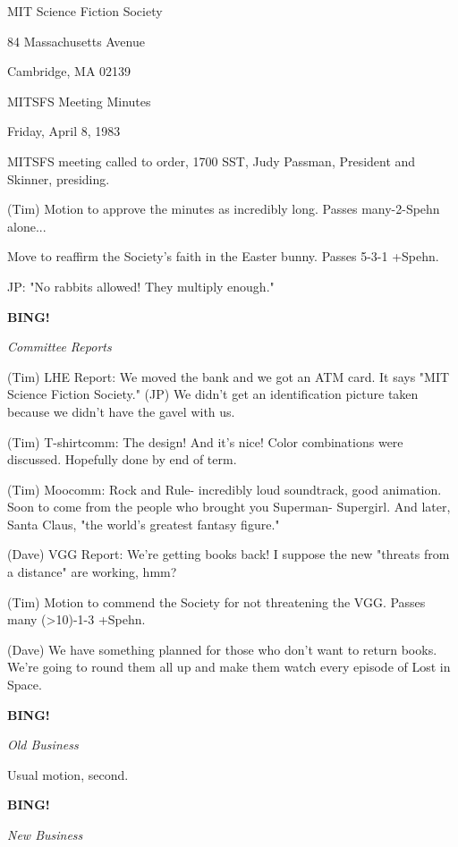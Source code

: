 \documentclass[12pt]{article}
\newcommand{\bing}{{\bf BING!} }
\newcommand{\goto}[1]{\bing \vskip 12pt \centerline{{\em{#1}}}}
\begin{document}
\begin{center}

MIT Science Fiction Society 

84 Massachusetts Avenue

Cambridge, MA 02139

\vspace{12pt}

MITSFS Meeting Minutes 

Friday, April 8, 1983

\end{center}
 
\vspace{18pt}

\setlength{\parskip}{6pt}

\noindent
MITSFS meeting called to order, 1700 SST,
Judy Passman, President and Skinner, presiding.

(Tim) Motion to approve the minutes as incredibly long. Passes many-2-Spehn alone...

Move to reaffirm the Society's faith in the Easter bunny. Passes 5-3-1 +Spehn.

JP: "No rabbits allowed! They multiply enough."

\goto{Committee Reports}

(Tim) LHE Report: We moved the bank and we got an ATM card. It says "MIT Science Fiction Society." (JP) We didn't get an identification picture taken because we didn't have the gavel with us.

(Tim) T-shirtcomm: The design! And it's nice! Color combinations were discussed. Hopefully done by end of term.

(Tim) Moocomm: Rock and Rule- incredibly loud soundtrack, good animation. Soon to come from the people who brought you Superman- Supergirl. And later, Santa Claus, "the world's greatest fantasy figure."

(Dave) VGG Report: We're getting books back! I suppose the new "threats from a distance" are working, hmm?

(Tim) Motion to commend the Society for not threatening the VGG. Passes many (>10)-1-3 +Spehn.

(Dave) We have something planned for those who don't want to return books. We're going to round them all up and make them watch every episode of Lost in Space.

\goto{Old Business}

Usual motion, second.

\goto{New Business}
\end{document}
